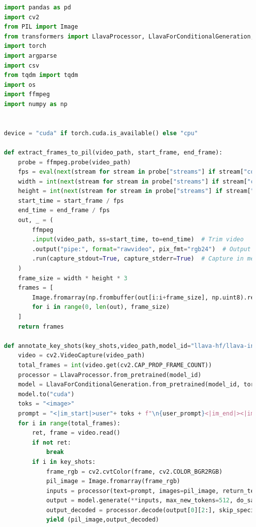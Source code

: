\documentclass[12pt]{report}
\begin{document}
	\begin{lstlisting}[language=Python,caption={LLM Inference Code}]
import pandas as pd
import cv2
from PIL import Image
from transformers import LlavaProcessor, LlavaForConditionalGeneration, AutoImageProcessor, SiglipForImageClassification,pipeline
import torch
import argparse
import csv
from tqdm import tqdm
import os
import ffmpeg
import numpy as np


device = "cuda" if torch.cuda.is_available() else "cpu"

def extract_frames_to_pil(video_path, start_frame, end_frame):
    probe = ffmpeg.probe(video_path)
    fps = eval(next(stream for stream in probe["streams"] if stream["codec_type"] == "video")["r_frame_rate"])
    width = int(next(stream for stream in probe["streams"] if stream["codec_type"] == "video")["width"])
    height = int(next(stream for stream in probe["streams"] if stream["codec_type"] == "video")["height"])
    start_time = start_frame / fps
    end_time = end_frame / fps
    out, _ = (
        ffmpeg
        .input(video_path, ss=start_time, to=end_time)  # Trim video
        .output("pipe:", format="rawvideo", pix_fmt="rgb24")  # Output raw RGB frames
        .run(capture_stdout=True, capture_stderr=True)  # Capture in memory
    )
    frame_size = width * height * 3
    frames = [
        Image.fromarray(np.frombuffer(out[i:i+frame_size], np.uint8).reshape((height, width, 3)), 'RGB')
        for i in range(0, len(out), frame_size)
    ]
    return frames

def annotate_key_shots(key_shots,video_path,model_id="llava-hf/llava-interleave-qwen-7b-hf",user_prompt = "What is this scene about?"):
    video = cv2.VideoCapture(video_path)
    total_frames = int(video.get(cv2.CAP_PROP_FRAME_COUNT))
    processor = LlavaProcessor.from_pretrained(model_id)
    model = LlavaForConditionalGeneration.from_pretrained(model_id, torch_dtype=torch.float16,load_in_4bit=True)
    model.to("cuda")
    toks = "<image>"
    prompt = "<|im_start|>user"+ toks + f"\n{user_prompt}<|im_end|><|im_start|>assistant"
    for i in range(total_frames):
        ret, frame = video.read()
        if not ret:
            break
        if i in key_shots:
            frame_rgb = cv2.cvtColor(frame, cv2.COLOR_BGR2RGB)
            pil_image = Image.fromarray(frame_rgb)
            inputs = processor(text=prompt, images=pil_image, return_tensors="pt").to(model.device, model.dtype)
            output = model.generate(**inputs, max_new_tokens=512, do_sample=False)
            output_decoded = processor.decode(output[0][2:], skip_special_tokens=True)[len(user_prompt)+10:]
            yield (pil_image,output_decoded)


\end{lstlisting}
\end{document}
